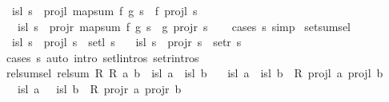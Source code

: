 \begin{isabellebody}
\ \ {\isachardoublequoteopen}isl\ s\ {\isasymLongrightarrow}\ projl\ {\isacharparenleft}{\kern0pt}map{\isacharunderscore}{\kern0pt}sum\ f\ g\ s{\isacharparenright}{\kern0pt}\ {\isacharequal}{\kern0pt}\ f\ {\isacharparenleft}{\kern0pt}projl\ s{\isacharparenright}{\kern0pt}{\isachardoublequoteclose}\isanewline
\ \ {\isachardoublequoteopen}{\isasymnot}\ isl\ s\ {\isasymLongrightarrow}\ projr\ {\isacharparenleft}{\kern0pt}map{\isacharunderscore}{\kern0pt}sum\ f\ g\ s{\isacharparenright}{\kern0pt}\ {\isacharequal}{\kern0pt}\ g\ {\isacharparenleft}{\kern0pt}projr\ s{\isacharparenright}{\kern0pt}{\isachardoublequoteclose}\isanewline
%
\isadelimproof
\ \ %
\endisadelimproof
%
\isatagproof
{}\isamarkupfalse%
\ {\isacharparenleft}{\kern0pt}cases\ s{\isacharsemicolon}{\kern0pt}\ simp{\isacharparenright}{\kern0pt}{\isacharplus}{\kern0pt}%
\endisatagproof
{\isafoldproof}%
%
\isadelimproof
\isanewline
%
\endisadelimproof
\isanewline
{}\isamarkupfalse%
\ set{\isacharunderscore}{\kern0pt}sum{\isacharunderscore}{\kern0pt}sel{\isacharcolon}{\kern0pt}\isanewline
\ \ {\isachardoublequoteopen}isl\ s\ {\isasymLongrightarrow}\ projl\ s\ {\isasymin}\ setl\ s{\isachardoublequoteclose}\isanewline
\ \ {\isachardoublequoteopen}{\isasymnot}\ isl\ s\ {\isasymLongrightarrow}\ projr\ s\ {\isasymin}\ setr\ s{\isachardoublequoteclose}\isanewline
%
\isadelimproof
\ \ %
\endisadelimproof
%
\isatagproof
{}\isamarkupfalse%
\ {\isacharparenleft}{\kern0pt}cases\ s{\isacharsemicolon}{\kern0pt}\ auto\ intro{\isacharcolon}{\kern0pt}\ setl{\isachardot}{\kern0pt}intros\ setr{\isachardot}{\kern0pt}intros{\isacharparenright}{\kern0pt}{\isacharplus}{\kern0pt}%
\endisatagproof
{\isafoldproof}%
%
\isadelimproof
\isanewline
%
\endisadelimproof
\isanewline
{}\isamarkupfalse%
\ rel{\isacharunderscore}{\kern0pt}sum{\isacharunderscore}{\kern0pt}sel{\isacharcolon}{\kern0pt}\ {\isachardoublequoteopen}rel{\isacharunderscore}{\kern0pt}sum\ R{}\ R{}\ a\ b\ {\isacharequal}{\kern0pt}\ {\isacharparenleft}{\kern0pt}isl\ a\ {\isacharequal}{\kern0pt}\ isl\ b\ {\isasymand}\isanewline
\ \ {\isacharparenleft}{\kern0pt}isl\ a\ {\isasymlongrightarrow}\ isl\ b\ {\isasymlongrightarrow}\ R{}\ {\isacharparenleft}{\kern0pt}projl\ a{\isacharparenright}{\kern0pt}\ {\isacharparenleft}{\kern0pt}projl\ b{\isacharparenright}{\kern0pt}{\isacharparenright}{\kern0pt}\ {\isasymand}\isanewline
\ \ {\isacharparenleft}{\kern0pt}{\isasymnot}\ isl\ a\ {\isasymlongrightarrow}\ {\isasymnot}\ isl\ b\ {\isasymlongrightarrow}\ R{}\ {\isacharparenleft}{\kern0pt}projr\ a{\isacharparenright}{\kern0pt}\ {\isacharparenleft}{\kern0pt}projr\ b{\isacharparenright}{\kern0pt}{\isacharparenright}{\kern0pt}{\isacharparenright}{\kern0pt}{\isachardoublequoteclose}\isanewline

\end{isabellebody}
